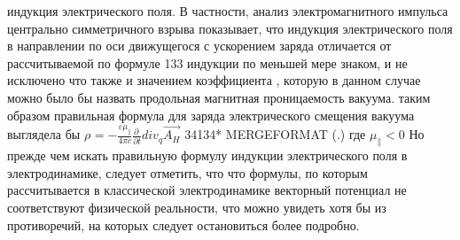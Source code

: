 \documentclass[11pt]{article}
\begin{document}
индукция электрического поля. В частности, анализ электромагнитного
импульса центрально симметричного взрыва показывает, что индукция
электрического поля в направлении по оси движущегося с ускорением заряда
отличается от рассчитываемой по формуле 133 индукции по меньшей мере
знаком, и не исключено что также и значением коэффициента , которую в
данном случае можно было бы назвать продольная магнитная проницаемость
вакуума. таким образом правильная формула для заряда электрического
смещения вакуума выглядела бы
\({{\rho }_{}}=-\frac{\varepsilon {{\mu }_{\parallel }}}{4\pi c}\frac{\partial \ }{\partial t}di{{v}_{q}}\overrightarrow{{{A}_{H}}}\)
34134* MERGEFORMAT (.) где \({{\mu }_{\parallel }}<0\) Но прежде чем
искать правильную формулу индукции электрического поля в
электродинамике, следует отметить, что что формулы, по которым
рассчитывается в классической электродинамике векторный потенциал не
соответствуют физической реальности, что можно увидеть хотя бы из
противоречий, на которых следует остановиться более подробно.
\end{document}
